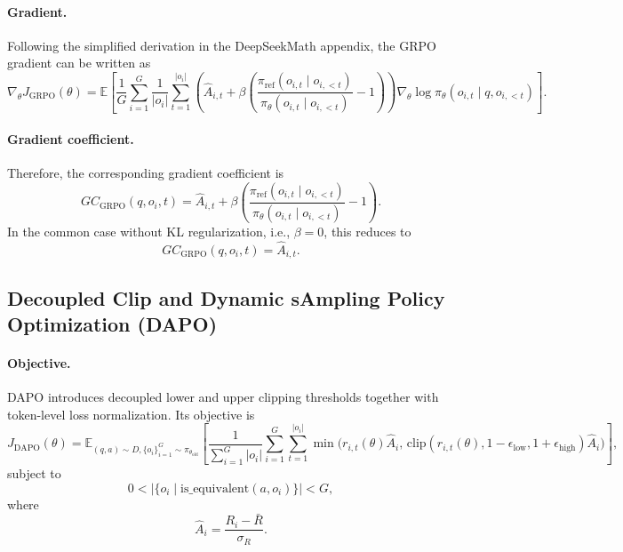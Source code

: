 \documentclass{article}
\begin{document}
\paragraph{Gradient.}
Following the simplified derivation in the DeepSeekMath appendix, the GRPO gradient can be
written as
\begin{equation}
\nabla_\theta J_{\mathrm{GRPO}}(\theta)
=
\mathbb{E}
\left[
\frac{1}{G}
\sum_{i=1}^G
\frac{1}{|o_i|}
\sum_{t=1}^{|o_i|}
\left(
\hat A_{i,t}
+
\beta\left(
\frac{\pi_{\mathrm{ref}}(o_{i,t}\mid o_{i,<t})}
{\pi_\theta(o_{i,t}\mid o_{i,<t})}
-1
\right)
\right)
\nabla_\theta \log \pi_\theta(o_{i,t}\mid q,o_{i,<t})
\right].
\label{eq:grpo_gradient}
\end{equation}

\paragraph{Gradient coefficient.}
Therefore, the corresponding gradient coefficient is
\begin{equation}
GC_{\mathrm{GRPO}}(q,o_i,t)
=
\hat A_{i,t}
+
\beta\left(
\frac{\pi_{\mathrm{ref}}(o_{i,t}\mid o_{i,<t})}
{\pi_\theta(o_{i,t}\mid o_{i,<t})}
-1
\right).
\label{eq:grpo_gc}
\end{equation}
In the common case without KL regularization, i.e., $\beta=0$, this reduces to
\begin{equation}
GC_{\mathrm{GRPO}}(q,o_i,t)=\hat A_{i,t}.
\label{eq:grpo_gc_no_kl}
\end{equation}

\subsection{Decoupled Clip and Dynamic sAmpling Policy Optimization (DAPO)}

\paragraph{Objective.}
DAPO introduces decoupled lower and upper clipping thresholds together with token-level loss
normalization. Its objective is
\begin{equation}
J_{\mathrm{DAPO}}(\theta)
=
\mathbb{E}_{(q,a)\sim D,\{o_i\}_{i=1}^G\sim \pi_{\theta_{\mathrm{old}}}}
\left[
\frac{1}{\sum_{i=1}^G |o_i|}
\sum_{i=1}^G
\sum_{t=1}^{|o_i|}
\min\!\bigl(
r_{i,t}(\theta)\hat A_i,\,
\mathrm{clip}(r_{i,t}(\theta),1-\epsilon_{\mathrm{low}},1+\epsilon_{\mathrm{high}})\hat A_i
\bigr)
\right],
\label{eq:dapo_objective}
\end{equation}
subject to
\begin{equation}
0<
\left|\{o_i \mid \mathrm{is\_equivalent}(a,o_i)\}\right|
<G,
\label{eq:dapo_sampling_constraint}
\end{equation}
where
\begin{equation}
\hat A_i=\frac{R_i-\bar R}{\sigma_R}.
\label{eq:dapo_advantage}
\end{equation}
\end{document}
